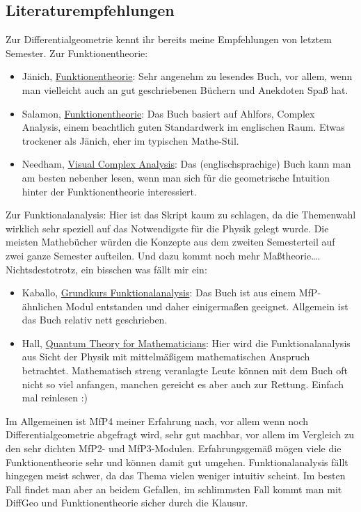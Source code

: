 \subsection{Literaturempfehlungen}
Zur Differentialgeometrie kennt ihr bereits meine Empfehlungen von letztem Semester.
Zur Funktionentheorie:
\begin{itemize}
\item Jänich, \href{https://link.springer.com/book/10.1007/3-540-35015-2}{Funktionentheorie}: Sehr angenehm zu lesendes Buch, vor allem, wenn man vielleicht auch an gut geschriebenen Büchern und Anekdoten Spaß hat. 
\item Salamon, \href{https://link.springer.com/book/10.1007/978-3-0348-0169-0}{Funktionentheorie}: Das Buch basiert auf Ahlfors, Complex Analysis, einem beachtlich guten Standardwerk im englischen Raum. Etwas trockener als Jänich, eher im typischen Mathe-Stil.
\item Needham, \href{https://umv.science.upjs.sk/hutnik/NeedhamVCA.pdf}{Visual Complex Analysis}: Das (englischsprachige) Buch kann man am besten nebenher lesen, wenn man sich für die geometrische Intuition hinter der Funktionentheorie interessiert.
\end{itemize}
Zur Funktionalanalysis:
Hier ist das Skript kaum zu schlagen, da die Themenwahl wirklich sehr speziell auf das Notwendigste für die Physik gelegt wurde. Die meisten Mathebücher würden die Konzepte aus dem zweiten Semesterteil auf zwei ganze Semester aufteilen. Und dazu kommt noch mehr Maßtheorie\dots. Nichtsdestotrotz, ein bisschen was fällt mir ein:
\begin{itemize}
\item Kaballo, \href{https://link.springer.com/book/10.1007/978-3-662-54748-9}{Grundkurs Funktionalanalysis}: Das Buch ist aus einem MfP-ähnlichen Modul entstanden und daher einigermaßen geeignet. Allgemein ist das Buch relativ nett geschrieben.
\item Hall, \href{https://link.springer.com/book/10.1007/978-1-4614-7116-5}{Quantum Theory for Mathematicians}: Hier wird die Funktionalanalysis aus Sicht der Physik mit mittelmäßigem mathematischen Anspruch betrachtet. Mathematisch streng veranlagte Leute können mit dem Buch oft nicht so viel anfangen, manchen gereicht es aber auch zur Rettung. Einfach mal reinlesen :)
\end{itemize}
Im Allgemeinen ist MfP4 meiner Erfahrung nach, vor allem wenn noch Differentialgeometrie abgefragt wird, sehr gut machbar, vor allem im Vergleich zu den sehr dichten MfP2- und MfP3-Modulen. Erfahrungsgemäß mögen viele die Funktionentheorie sehr und können damit gut umgehen. Funktionalanalysis fällt hingegen meist schwer, da das Thema vielen weniger intuitiv scheint. Im besten Fall findet man aber an beidem Gefallen, im schlimmsten Fall kommt man mit DiffGeo und Funktionentheorie sicher durch die Klausur.


